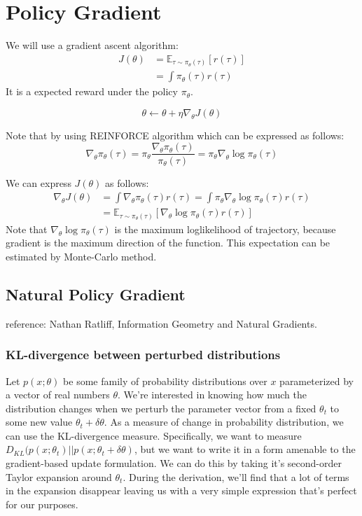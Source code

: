 \chapter{Policy Gradient}
We will use a gradient ascent algorithm:
\begin{align*}
	J(\theta) &=  \mathbb{E}_{\tau\sim \pi_\theta(\tau)}[r(\tau)]\\
	&= \int \pi_\theta(\tau) r(\tau)
	\label{eq:cost_fn}
\end{align*}
It is a expected reward under the policy $\pi_\theta$.

$$\theta \leftarrow \theta + \eta \nabla_\theta J(\theta)$$

Note that by using REINFORCE algorithm which can be expressed as follows:
$$\nabla_\theta \pi_\theta(\tau) = \pi_\theta \frac{\nabla_\theta \pi_\theta(\tau)}{\pi_\theta(\tau)} = \pi_\theta \nabla_\theta \log \pi_\theta(\tau)$$

We can express $J(\theta)$ as follows:
\begin{align*}
    \nabla_\theta J(\theta) &= \int \nabla_\theta\pi_\theta(\tau) r(\tau) = \int \pi_\theta \nabla_\theta \log \pi_\theta(\tau)r(\tau)\\
	&= \mathbb{E}_{\tau\sim \pi_\theta(\tau)}[\nabla_\theta \log \pi_\theta(\tau)r(\tau)] 
\end{align*}
Note that $\nabla_\theta \log \pi_\theta(\tau)$ is the maximum loglikelihood of trajectory, because gradient is the maximum direction of the function. This expectation can be estimated by Monte-Carlo method. 

\section{Natural Policy Gradient}
reference: Nathan Ratliff, Information Geometry and Natural Gradients. 
\subsection{KL-divergence between perturbed distributions}
Let $p(x; \theta)$ be some family of probability distributions over $x$ parameterized by a vector of real numbers $\theta$. We're interested in knowing how much the distribution changes when we perturb the parameter vector from a fixed $\theta_t$ to some new value $\theta_t+\delta \theta$. As a measure of change in probability distribution, we can use the KL-divergence measure. Specifically, we want to measure $D_{KL}(p(x;\theta_t)|| p(x;\theta_t+\delta \theta)$, but we want to write it in a form amenable to the gradient-based update formulation. We can do this by taking it's second-order Taylor expansion around $\theta_t$. During the derivation, we'll find that a lot of terms in the expansion disappear leaving us with a very simple expression that's perfect for our purposes. 

